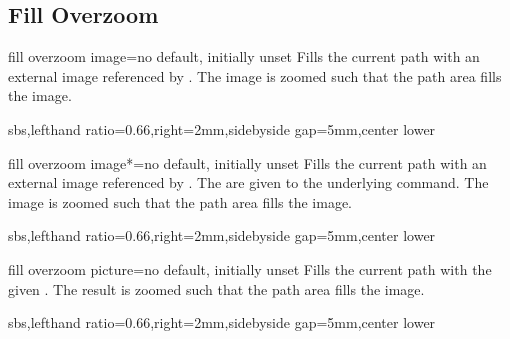 \documentclass{article}
\newenvironment{dispExample*}[1]{\par}{}
\begin{document}
\clearpage
\subsection{Fill Overzoom}
\begin{docTikzKey}{fill overzoom image}{=}{no default, initially unset}
  Fills the current path with an external image referenced by .
  The image is zoomed such that the path area fills the image.
\begin{dispExample*}{sbs,lefthand ratio=0.66,right=2mm,sidebyside gap=5mm,center lower}
\end{dispExample*}
\end{docTikzKey}


\begin{docTikzKey}{fill overzoom image*}{=}{no default, initially unset}
  Fills the current path with an external image referenced by .
  The  are given to the underlying  command.
  The image is zoomed such that the path area fills the image.
\begin{dispExample*}{sbs,lefthand ratio=0.66,right=2mm,sidebyside gap=5mm,center lower}
\end{dispExample*}
\end{docTikzKey}


\begin{docTikzKey}{fill overzoom picture}{=}{no default, initially unset}
  Fills the current path with the given .
  The result is zoomed such that the path area fills the image.
\begin{dispExample*}{sbs,lefthand ratio=0.66,right=2mm,sidebyside gap=5mm,center lower}
\end{dispExample*}
\end{docTikzKey}
\end{document}
